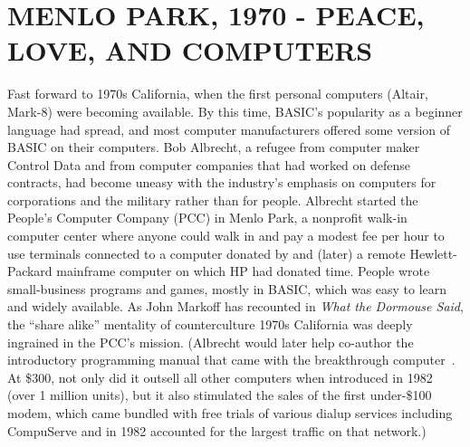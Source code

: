 
\section{MENLO PARK, 1970 - PEACE, LOVE, AND COMPUTERS}





Fast forward to 1970s California, when the first personal computers
(Altair, Mark-8) were becoming available.
By this time, BASIC's popularity as a beginner language had spread,
and most computer manufacturers offered some version of BASIC on their
computers.
Bob Albrecht, a refugee from computer maker Control Data and from
computer companies that had worked on defense contracts, had become
uneasy with the industry's emphasis on computers for corporations and
the military rather than for people.
Albrecht started the People's Computer Company (PCC) in Menlo Park, a
nonprofit walk-in computer center where anyone could walk in and pay
a modest fee per hour to use terminals connected to a  computer donated by
 and (later) a remote Hewlett-Packard
mainframe computer on which HP had donated time.
People wrote small-business programs and games, mostly in BASIC, which
was easy to learn and widely available.
As John Markoff has recounted in \emph{What the Dormouse Said}, the
``share alike'' mentality of counterculture 1970s California was
deeply ingrained in the PCC's mission.
(Albrecht would later help co-author the introductory programming manual
that came with the breakthrough 
computer~\cite{commodore}.  At \$300, not only did it outsell all other
computers when introduced in 1982 (over 1 million units), but it also
stimulated the sales of the first under-\$100 modem, which came bundled
with free trials of various dialup services including CompuServe and in
1982 accounted for the largest traffic on that network.)


